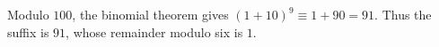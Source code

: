 Modulo $100$, the binomial theorem gives $(1+10)^9\equiv1+90=91$. Thus the suffix is $91$, whose remainder modulo six is $\boxed1$.
